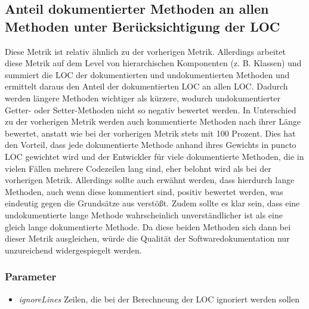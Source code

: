  \subsection{Anteil dokumentierter Methoden an allen Methoden unter Berücksichtigung der LOC}
Diese Metrik ist relativ ähnlich zu der vorherigen Metrik. Allerdings arbeitet diese Metrik auf dem Level von hierarchischen Komponenten (z. B. Klassen) und summiert die \ac{LOC} der dokumentierten und undokumentierten Methoden und ermittelt daraus den Anteil der dokumentierten \ac{LOC} an allen \ac{LOC}. Dadurch werden längere Methoden wichtiger als kürzere, wodurch undokumentierter Getter- oder Setter-Methoden nicht so negativ bewertet werden. In Unterschied zu der vorherigen Metrik werden auch kommentierte Methoden nach ihrer Länge bewertet, anstatt wie bei der vorherigen Metrik stets mit 100 Prozent. Dies hat den Vorteil, dass jede dokumentierte Methode anhand ihres Gewichts in puncto \ac{LOC} gewichtet wird und der Entwickler für viele dokumentierte Methoden, die in vielen Fällen mehrere Codezeilen lang sind, eher belohnt wird als bei der vorherigen Metrik. Allerdings sollte auch erwähnt werden, dass hierdurch lange Methoden, auch wenn diese kommentiert sind, positiv bewertet werden, was eindeutig gegen die Grundsätze aus \cite[S. 34]{martin2009clean} verstößt. Zudem sollte es klar sein, dass eine undokumentierte lange Methode wahrscheinlich unverständlicher ist als eine gleich lange dokumentierte Methode. Da diese beiden Methoden sich dann bei dieser Metrik ausgleichen, würde die Qualität der Softwaredokumentation nur unzureichend widergespiegelt werden.
  \subsubsection{Parameter}
  \begin{itemize}
     \item \textit{ignoreLines} Zeilen, die bei der Berechneung der \ac{LOC} ignoriert werden sollen
 \end{itemize}
 